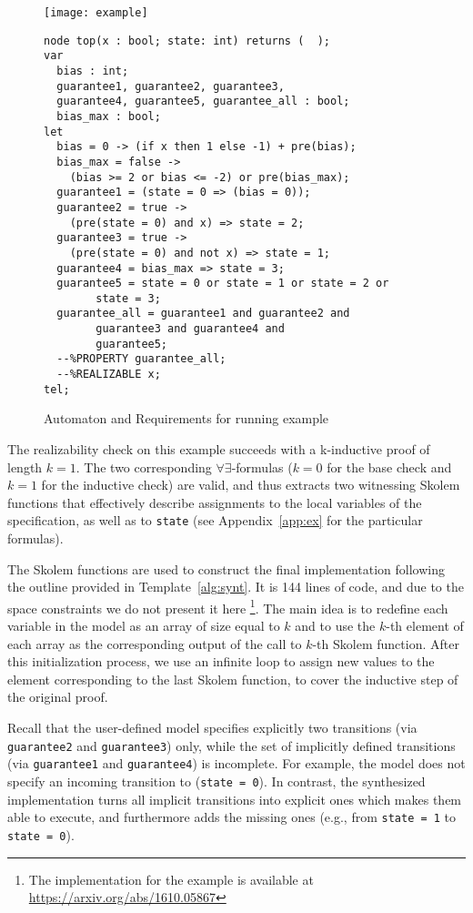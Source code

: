 \begin{figure}[tb]
\begin{minipage}[c]{0.35\textwidth}
\centering
\texttt{[image: example]}
\end{minipage}
\begin{minipage}[c]{0.6\textwidth}
 \begin{Verbatim}[fontsize=\scriptsize]
node top(x : bool; state: int) returns (  );
var
  bias : int;
  guarantee1, guarantee2, guarantee3,
  guarantee4, guarantee5, guarantee_all : bool;
  bias_max : bool;
let
  bias = 0 -> (if x then 1 else -1) + pre(bias);
  bias_max = false ->
	(bias >= 2 or bias <= -2) or pre(bias_max);
  guarantee1 = (state = 0 => (bias = 0));
  guarantee2 = true ->
  	(pre(state = 0) and x) => state = 2;
  guarantee3 = true ->
  	(pre(state = 0) and not x) => state = 1;
  guarantee4 = bias_max => state = 3;
  guarantee5 = state = 0 or state = 1 or state = 2 or 
  		state = 3;
  guarantee_all = guarantee1 and guarantee2 and
  		guarantee3 and guarantee4 and 
  		guarantee5;
  --%PROPERTY guarantee_all;
  --%REALIZABLE x;
tel;
 \end{Verbatim}
\end{minipage}
\caption{Automaton and Requirements for running example}
\label{fg:example}
\end{figure}

The realizability check on this example succeeds with a k-inductive
proof of length $k = 1$. The two corresponding
$\forall\exists$-formulas ($k=0$ for the base check and $k=1$ for the
inductive check) are valid, and thus \aeval extracts two witnessing
Skolem functions that effectively describe assignments to the local
variables of the specification, as well as to \texttt{state} (see
Appendix~\ref{app:ex} for the particular formulas).

The Skolem functions are used to construct the final implementation
following the outline provided in Template~\ref{alg:synt}. 
It is 144 lines of code, and due to the space constraints we do not
present it here%
\footnote{The implementation for the
example is available at \url{https://arxiv.org/abs/1610.05867}}.
The main idea is to redefine each variable in the model
as an array of size equal to $k$ and
to use the $k$-th element of each array as the corresponding output of the call
to $k$-th Skolem function. After this initialization process, we use an infinite
loop to assign new values to the element corresponding to the last Skolem
function, to cover the inductive step of the original proof.

Recall that the user-defined model specifies explicitly two transitions (via \texttt{guarantee2} and \texttt{guarantee3}) only, while the set of implicitly defined transitions (via \texttt{guarantee1} and \texttt{guarantee4}) is incomplete.
For example, the model does not specify an incoming transition to (\texttt{state = 0}).
In contrast, the synthesized implementation turns all implicit transitions into explicit ones which makes them able to execute, and furthermore adds the missing ones (e.g., from \texttt{state = 1} to \texttt{state = 0}).


